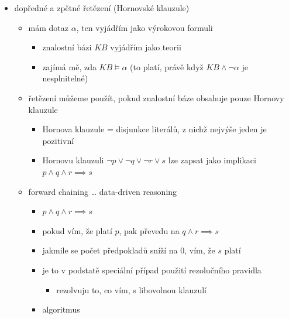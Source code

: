\begin{itemize}
\begin{itemize}
\item praktické poznámky
\begin{itemize}
\item čistý výskyt se zas tak moc nepoužívá
\item jednotková propagace
\begin{itemize}
\item hledám klauzule o jedné proměnné
\item je v zásadě ekvivalentní hranové konzistenci
\end{itemize}
\item ke zkoušení hodnot proměnných se používá tree search
\end{itemize}
\end{itemize}
\item dopředné a zpětné řetězení (Hornovské klauzule)
\begin{itemize}
\item mám dotaz $\alpha$, ten vyjádřím jako výrokovou formuli
\begin{itemize}
\item znalostní bázi $KB$ vyjádřím jako teorii
\item zajímá mě, zda $KB\models\alpha$ (to platí, právě když $KB\land\neg\alpha$ je nesplnitelné)
\end{itemize}
\item řetězení můžeme použít, pokud znalostní báze obsahuje pouze Hornovy klauzule
\begin{itemize}
\item Hornova klauzule = disjunkce literálů, z nichž nejvýše jeden je pozitivní
\item Hornovu klauzuli $\neg p\lor\neg q\lor\neg r\lor s$ lze zapsat jako implikaci $p\land q\land r\implies s$
\end{itemize}
\item forward chaining \dots{} data-driven reasoning
\begin{itemize}
\item $p\land q\land r\implies s$
\item pokud vím, že platí $p$, pak převedu na $q\land r\implies s$
\item jakmile se počet předpokladů sníží na 0, vím, že $s$ platí
\item je to v podstatě speciální případ použití rezolučního pravidla
\begin{itemize}
\item rezolvuju to, co vím, s libovolnou klauzulí
\end{itemize}
\item algoritmus

\end{itemize}
\end{itemize}
\end{itemize}
